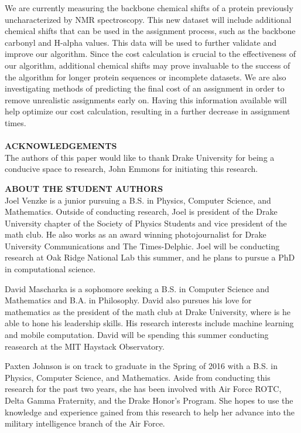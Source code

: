 \documentclass{article}
\begin{document}
We are currently measuring the backbone chemical shifts of a protein previously uncharacterized by NMR spectroscopy. This new dataset will include additional chemical shifts that can be used in the assignment process, such as the backbone carbonyl and H-alpha values. This data will be used to further validate and improve our algorithm. Since the cost calculation is crucial to the effectiveness of our algorithm, additional chemical shifts may prove invaluable to the success of the algorithm for longer protein sequences or incomplete datasets. We are also investigating methods of predicting the final cost of an assignment in order to remove unrealistic assignments early on. Having this information available will help optimize our cost calculation, resulting in a further decrease in assignment times. 
\\\\
\textbf{ACKNOWLEDGEMENTS}
\\
The authors of this paper would like to thank Drake University for being a conducive space to research, John Emmons for initiating this research.
\renewcommand{\refname}{\normalfont\selectfont\large \textbf{REFERENCES}}



\vspace{1cm}
\noindent\textbf{ABOUT THE STUDENT AUTHORS}\\
\indent Joel Venzke is a junior pursuing a B.S. in Physics, Computer Science, and  Mathematics. Outside of conducting research, Joel is president of the Drake University chapter of the Society of Physics Students and vice president of the math club. He also works as an award winning photojournalist for Drake University Communications and The Times-Delphic. Joel will be conducting research at Oak Ridge National Lab this summer, and he plans to pursue a PhD in computational science.

David Mascharka is a sophomore seeking a B.S. in Computer Science and Mathematics and B.A. in Philosophy. David also pursues his love for mathematics as the president of the math club at Drake University, where is he able to hone his leadership skills. His research interests include machine learning and mobile computation. David will be spending this summer conducting reasearch at the MIT Haystack Observatory.

Paxten Johnson is on track to graduate in the Spring of 2016 with a B.S. in Physics, Computer Science, and Mathematics. Aside from conducting this research for the past two years, she has been involved with Air Force ROTC, Delta Gamma Fraternity, and the Drake Honor's Program. She hopes to use the knowledge and experience gained from this research to help her advance into the military intelligence branch of the Air Force.
\end{document}
